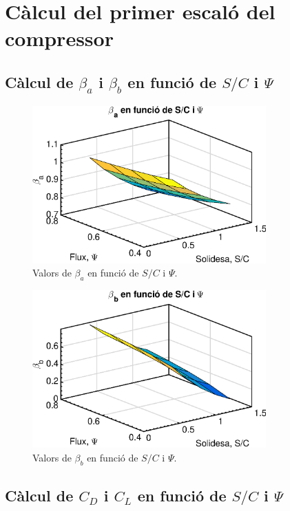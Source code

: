 \section{Càlcul del primer escaló del compressor}

\subsection{Càlcul de $\beta_a$ i $\beta_b$ en funció de $S/C$ i $\Psi$}
\begin{figure}[H]
	\centering
	\includegraphics[width=0.8\textwidth]{./code/figures/parametres/betA}
	\caption{Valors de $\beta_a$ en funció de $S/C$ i $\Psi$.}
	\label{betA}
\end{figure}

\begin{figure}[H]
	\centering
	\includegraphics[width=0.8\textwidth]{./code/figures/parametres/betB}
	\caption{Valors de $\beta_b$ en funció de $S/C$ i $\Psi$.}
	\label{betB}
\end{figure}

\subsection{Càlcul de $C_D$ i $C_L$ en funció de $S/C$ i $\Psi$}

